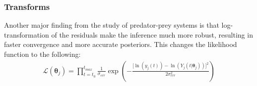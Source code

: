 \documentclass[11pt]{article}
\begin{document}
\subsubsection{Transforms}
Another major finding from the study of predator-prey systems \cite{rosenbaum} is that log-transformation of the residuals make the inference much more robust, resulting in faster convergence and more accurate posteriors. This changes the likelihood function to the following:
\begin{align*}
    \mathcal{L}(\boldsymbol{\theta}_j) = \prod_{t=t_0}^{t_{max}} \frac{1}{\sigma_{err}} \exp\left(-\frac{\lbrack\ln(y_{j}(t)) - \ln(Y_j(t|\boldsymbol{\theta}_j))\rbrack^2}{2\sigma_{err}^2}\right)  
\end{align*}


\end{document}
